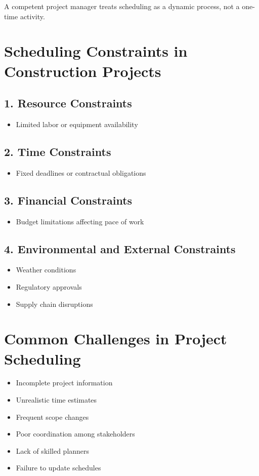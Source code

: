\documentclass[12pt,a4paper]{article}
\begin{document}
A competent project manager treats scheduling as a dynamic process, not a one-time activity.

\section*{Scheduling Constraints in Construction Projects}

\subsection*{1. Resource Constraints}
\begin{itemize}
    \item Limited labor or equipment availability
\end{itemize}

\subsection*{2. Time Constraints}
\begin{itemize}
    \item Fixed deadlines or contractual obligations
\end{itemize}

\subsection*{3. Financial Constraints}
\begin{itemize}
    \item Budget limitations affecting pace of work
\end{itemize}

\subsection*{4. Environmental and External Constraints}
\begin{itemize}
    \item Weather conditions
    \item Regulatory approvals
    \item Supply chain disruptions
\end{itemize}

\section*{Common Challenges in Project Scheduling}
\begin{itemize}
    \item Incomplete project information
    \item Unrealistic time estimates
    \item Frequent scope changes
    \item Poor coordination among stakeholders
    \item Lack of skilled planners
    \item Failure to update schedules
\end{itemize}
\end{document}
